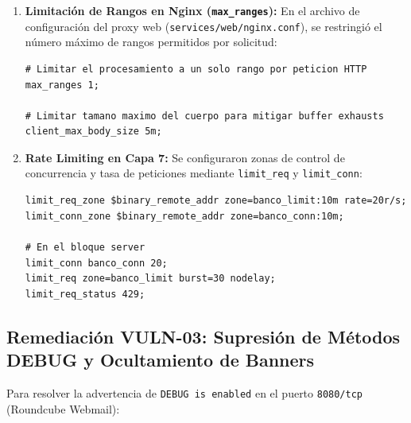 \begin{enumerate}
  \item \textbf{Limitación de Rangos en Nginx (\texttt{max\_ranges}):} En el archivo de configuración del proxy web (\texttt{services/web/nginx.conf}), se restringió el número máximo de rangos permitidos por solicitud:
\begin{lstlisting}[style=terminal, caption={Proteccion contra Ataques Byte-Range DoS en Nginx}, label={lst:mitigacion-ranges}]
# Limitar el procesamiento a un solo rango por peticion HTTP
max_ranges 1;

# Limitar tamano maximo del cuerpo para mitigar buffer exhausts
client_max_body_size 5m;
\end{lstlisting}

  \item \textbf{Rate Limiting en Capa 7:} Se configuraron zonas de control de concurrencia y tasa de peticiones mediante \texttt{limit\_req} y \texttt{limit\_conn}:
\begin{lstlisting}[style=terminal, caption={Limitacion de Conexiones y Tasa de Peticiones en Nginx}, label={lst:mitigacion-ratelimit}]
limit_req_zone $binary_remote_addr zone=banco_limit:10m rate=20r/s;
limit_conn_zone $binary_remote_addr zone=banco_conn:10m;

# En el bloque server
limit_conn banco_conn 20;
limit_req zone=banco_limit burst=30 nodelay;
limit_req_status 429;
\end{lstlisting}
\end{enumerate}

\subsection{Remediación VULN-03: Supresión de Métodos DEBUG y Ocultamiento de Banners}

Para resolver la advertencia de \texttt{DEBUG is enabled} en el puerto \texttt{8080/tcp} (Roundcube Webmail):

